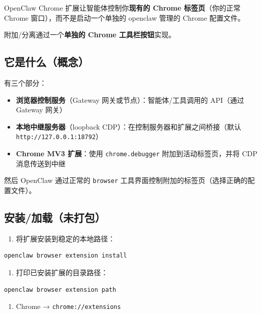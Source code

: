 OpenClaw Chrome 扩展让智能体控制你\textbf{现有的 Chrome 标签页}（你的正常 Chrome 窗口），而不是启动一个单独的 openclaw 管理的 Chrome 配置文件。

附加/分离通过一个\textbf{单独的 Chrome 工具栏按钮}实现。

\subsection{它是什么（概念）}


有三个部分：

\begin{itemize}
  \item \textbf{浏览器控制服务}（Gateway 网关或节点）：智能体/工具调用的 API（通过 Gateway 网关）
  \item \textbf{本地中继服务器}（loopback CDP）：在控制服务器和扩展之间桥接（默认 \texttt{http://127.0.0.1:18792}）
  \item \textbf{Chrome MV3 扩展}：使用 \texttt{chrome.debugger} 附加到活动标签页，并将 CDP 消息传送到中继
\end{itemize}


然后 OpenClaw 通过正常的 \texttt{browser} 工具界面控制附加的标签页（选择正确的配置文件）。

\subsection{安装/加载（未打包）}


\begin{enumerate}
  \item 将扩展安装到稳定的本地路径：
\end{enumerate}


\begin{lstlisting}[language=bash]
openclaw browser extension install
\end{lstlisting}


\begin{enumerate}
  \item 打印已安装扩展的目录路径：
\end{enumerate}


\begin{lstlisting}[language=bash]
openclaw browser extension path
\end{lstlisting}


\begin{enumerate}
  \item Chrome → \texttt{chrome://extensions}
\end{enumerate}


